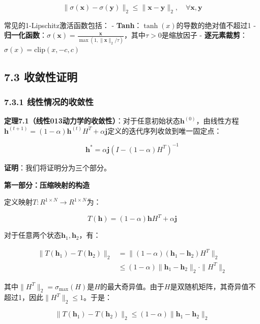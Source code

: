 \documentclass[
  12pt,
]{article}
\begin{document}
\[
\|\sigma(\textbf{x}) - \sigma(\textbf{y})\|_2 \leq \|\textbf{x} - \textbf{y}\|_2, \quad \forall \textbf{x}, \textbf{y}
\]

常见的1-Lipschitz激活函数包括： -
\textbf{Tanh}：\(\tanh(x)\)的导数的绝对值不超过1 -
\textbf{归一化函数}：\(\sigma(\textbf{x}) = \frac{\textbf{x}}{\max(1, \|\textbf{x}\|_2 / \tau)}\)，其中\(\tau > 0\)是缩放因子
- \textbf{逐元素裁剪}：\(\sigma(x) = \text{clip}(x, -c, c)\)

\hypertarget{ux6536ux655bux6027ux8bc1ux660e-1}{%
\subsection{7.3 收敛性证明}\label{ux6536ux655bux6027ux8bc1ux660e-1}}

\hypertarget{ux7ebfux6027ux60c5ux51b5ux7684ux6536ux655bux6027}{%
\subsubsection{7.3.1
线性情况的收敛性}\label{ux7ebfux6027ux60c5ux51b5ux7684ux6536ux655bux6027}}

\textbf{定理7.1（线性013动力学的收敛性）}：对于任意初始状态\(\textbf{h}^{(0)}\)，由线性方程\(\textbf{h}^{(t+1)} = (1 - \alpha) \textbf{h}^{(t)} H^T + \alpha \textbf{j}\)定义的迭代序列收敛到唯一固定点：

\[
\textbf{h}^* = \alpha \textbf{j} (I - (1-\alpha)H^T)^{-1}
\]

\textbf{证明}：我们将证明分为三个部分。

\textbf{第一部分：压缩映射的构造}

定义映射\(T: R^{1 \times N} \rightarrow R^{1 \times N}\)为：

\[
T(\textbf{h}) = (1-\alpha)\textbf{h}H^T + \alpha\textbf{j}
\]

对于任意两个状态\(\textbf{h}_1, \textbf{h}_2\)，有：

\[
\begin{aligned}
\|T(\textbf{h}_1) - T(\textbf{h}_2)\|_2 &= \|(1-\alpha)(\textbf{h}_1 - \textbf{h}_2)H^T\|_2 \\
&\leq (1-\alpha)\|\textbf{h}_1 - \textbf{h}_2\|_2 \cdot \|H^T\|_2
\end{aligned}
\]

其中\(\|H^T\|_2 = \sigma_{\max}(H)\)是\(H\)的最大奇异值。由于\(H\)是双随机矩阵，其奇异值不超过1，因此\(\|H^T\|_2 \leq 1\)。于是：

\[
\|T(\textbf{h}_1) - T(\textbf{h}_2)\|_2 \leq (1-\alpha)\|\textbf{h}_1 - \textbf{h}_2\|_2
\]
\end{document}
